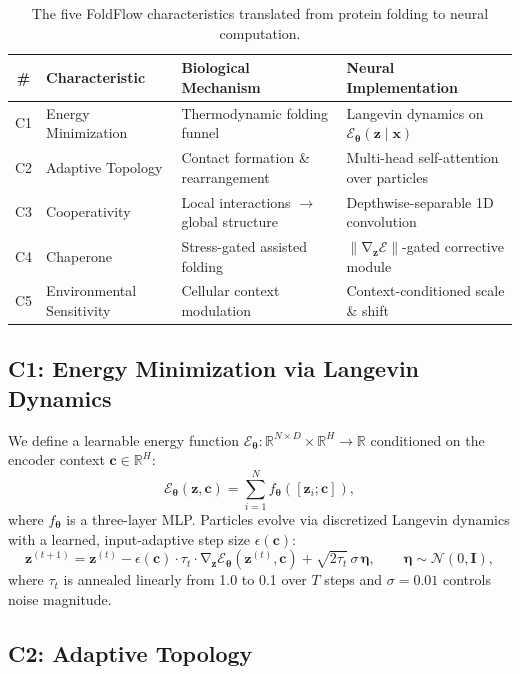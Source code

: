 \documentclass[10pt]{article}
\newcommand{\R}{\mathbb{R}}
\newcommand{\E}{\mathcal{E}}
\newcommand{\bz}{\mathbf{z}}
\newcommand{\bx}{\mathbf{x}}
\newcommand{\bc}{\mathbf{c}}
\newcommand{\btheta}{\boldsymbol{\theta}}
\DeclareMathOperator{\grad}{\nabla}
\begin{document}
\begin{table}[t]
\centering
\caption{The five FoldFlow characteristics translated from protein folding
  to neural computation.}
\label{tab:characteristics}
\small
\begin{tabular}{@{}clll@{}}
\toprule
\# & Characteristic & Biological Mechanism & Neural Implementation \\
\midrule
C1 & Energy Minimization & Thermodynamic folding funnel
    & Langevin dynamics on $\E_\btheta(\bz \mid \bx)$ \\
C2 & Adaptive Topology & Contact formation \& rearrangement
    & Multi-head self-attention over particles \\
C3 & Cooperativity & Local interactions $\to$ global structure
    & Depthwise-separable 1D convolution \\
C4 & Chaperone & Stress-gated assisted folding
    & $\|\grad_\bz \E\|$-gated corrective module \\
C5 & Environmental Sensitivity & Cellular context modulation
    & Context-conditioned scale \& shift \\
\bottomrule
\end{tabular}
\end{table}

\subsection{C1: Energy Minimization via Langevin Dynamics}
\label{sec:c1}

We define a learnable energy function
$\E_\btheta : \R^{N \times D} \times \R^{H} \to \R$ conditioned on
the encoder context $\bc \in \R^H$:
\begin{equation}
  \E_\btheta(\bz, \bc) = \sum_{i=1}^{N}
    f_\btheta([\bz_i; \bc]),
\label{eq:energy}
\end{equation}
where $f_\btheta$ is a three-layer MLP.  Particles evolve via
discretized Langevin dynamics with a learned, input-adaptive step size
$\epsilon(\bc)$:
\begin{equation}
  \bz^{(t+1)} = \bz^{(t)}
    - \epsilon(\bc) \cdot \tau_t \cdot \grad_\bz \E_\btheta(\bz^{(t)}, \bc)
    + \sqrt{2\tau_t}\,\sigma\,\boldsymbol{\eta},
  \qquad \boldsymbol{\eta} \sim \mathcal{N}(0, \mathbf{I}),
\label{eq:langevin}
\end{equation}
where $\tau_t$ is annealed linearly from 1.0 to 0.1 over $T$ steps
and $\sigma = 0.01$ controls noise magnitude.

\subsection{C2: Adaptive Topology}
\label{sec:c2}
\end{document}
